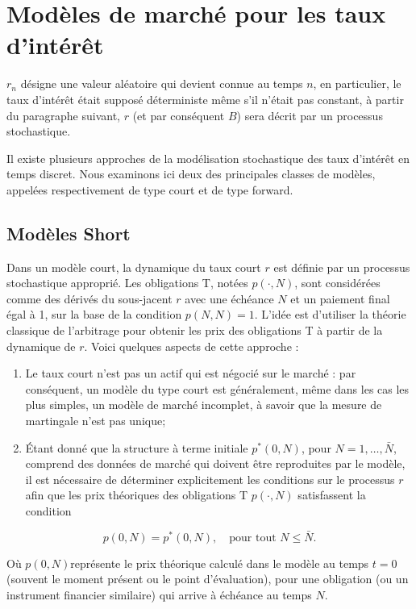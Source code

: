 \chapter{Modèles de marché pour les taux d’intérêt} %

\( r_n \) désigne une valeur aléatoire qui devient connue au temps \( n \), en particulier, le taux d'intérêt était supposé déterministe  même s'il n'était pas constant, à partir du paragraphe suivant, \( r \) (et par conséquent \( B \)) sera décrit par un processus stochastique. 

Il existe plusieurs approches de la modélisation stochastique des taux d'intérêt en temps discret. Nous examinons ici deux des principales classes de modèles, appelées respectivement de type court et de type forward. 
\section{Modèles Short}
Dans un modèle court, la dynamique du taux court \( r \) est définie par un processus stochastique approprié. Les obligations T, notées \( p(\cdot, N) \), sont considérées comme des dérivés du sous-jacent \( r \) avec une échéance \( N \) et un paiement final égal à 1, sur la base de la condition \( p(N, N) = 1 \). L'idée est d'utiliser la théorie classique de l'arbitrage pour obtenir les prix des obligations T à partir de la dynamique de \( r \). Voici quelques aspects de cette approche :

\begin{enumerate}
    \item Le taux court n'est pas un actif qui est négocié sur le marché : par conséquent, un modèle du type court est généralement, même dans les cas les plus simples, un modèle de marché incomplet, à savoir que la mesure de martingale n'est pas unique;
    \item Étant donné que la structure à terme initiale \( p^*(0, N) \), pour \( N = 1, \ldots, \bar{N} \), comprend des données de marché qui doivent être reproduites par le modèle, il est nécessaire de déterminer explicitement les conditions sur le processus \( r \) afin que les prix théoriques des obligations T \( p(\cdot, N) \) satisfassent la condition
\end{enumerate}
\begin{equation}
    p(0, N) = p^*(0, N), \quad \text{pour tout } N \leq \bar{N}.
\end{equation}

Où \( p(0, N) \)représente le prix théorique calculé dans le modèle au temps \( t=0 \) (souvent le moment présent ou le point d'évaluation), pour une obligation (ou un instrument financier similaire) qui arrive à échéance au temps \( N \).

